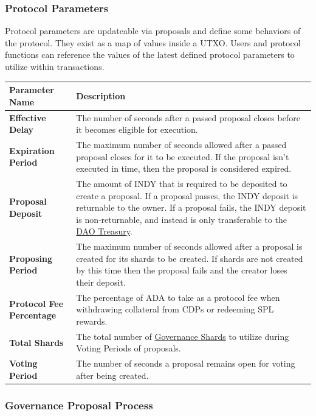 \documentclass{article}
\begin{document}
\begin{sloppypar}
\hypertarget{protocol-parameters}{%
\subsubsection{Protocol Parameters}\label{protocol-parameters}}

Protocol parameters are updateable via proposals and define some
behaviors of the protocol. They exist as a map of values inside a UTXO.
Users and protocol functions can reference the values of the latest
defined protocol parameters to utilize within transactions.

\begin{tabularx}{\linewidth}{l|L}
\caption{Parameters that are updateable via an Update Protocol
Parameters Governance Proposal}
\tabularnewline
\toprule
\textbf{Parameter Name} & \textbf{Description}
\tabularnewline
\midrule
\endhead
\textbf{Effective Delay} & The number of seconds after a passed proposal
closes before it becomes eligible for execution.
\tabularnewline
\midrule
\textbf{Expiration Period} & The maximum number of seconds allowed after
a passed proposal closes for it to be executed. If the proposal isn't
executed in time, then the proposal is considered
expired.
\tabularnewline
\midrule
\textbf{Proposal Deposit} & The amount of INDY that is required to be
deposited to create a proposal. If a proposal passes, the INDY deposit
is returnable to the owner. If a proposal fails, the INDY deposit is
non-returnable, and instead is only transferable to the
\protect\hyperlink{indigo-dao-treasury}{DAO Treasury}.
\tabularnewline
\midrule
\textbf{Proposing Period} & The maximum number of seconds allowed after
a proposal is created for its shards to be created. If shards are not
created by this time then the proposal fails and the creator loses their
deposit.
\tabularnewline
\midrule
\textbf{Protocol Fee Percentage} & The percentage of ADA to take as a
protocol fee when withdrawing collateral from CDPs or redeeming SPL
rewards.
\tabularnewline
\midrule
\textbf{Total Shards} & The total number of
\protect\hyperlink{governance-sharding}{Governance Shards} to utilize
during Voting Periods of proposals.
\tabularnewline
\midrule
\textbf{Voting Period} & The number of seconds a proposal remains open
for voting after being created.
\tabularnewline
\bottomrule
\end{tabularx}

\hypertarget{governance-proposal-process}{%
\subsubsection{Governance Proposal
Process}\label{governance-proposal-process}}


\end{sloppypar}
\end{document}
